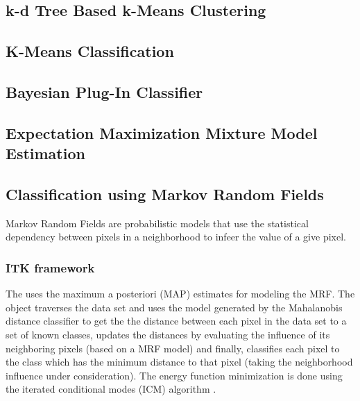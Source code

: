 \subsection{k-d Tree Based k-Means Clustering}
\label{sec:KdTreeBasedKMeansClustering}
\ifitkFullVersion

\fi

\subsection{K-Means Classification}
\label{sec:KMeansClassifier}
\ifitkFullVersion

\fi
\ifitkFullVersion

\fi

\subsection{Bayesian Plug-In Classifier}
\label{sec:BayesianPluginClassifier}

\ifitkFullVersion 

\fi


\subsection{Expectation Maximization Mixture Model Estimation}
\label{sec:ExpectationMaximizationMixtureModelEstimation}

\ifitkFullVersion 

\fi

\subsection{Classification using Markov Random Fields}
\label{sec:MarkovRandomField}

Markov Random Fields are probabilistic models that use the statistical
dependency between
pixels in a neighborhood to infeer the value of a give pixel.

\subsubsection{ITK framework}
\label{sec:MarkovRandomFieldITK}
The
 uses the maximum a posteriori (MAP)
estimates for modeling the MRF. The object traverses the data set and uses the
model generated by the Mahalanobis distance classifier to get the the distance
between each pixel in the data set to a set of known classes, updates the
distances by evaluating the influence of its neighboring pixels (based on a MRF
model) and finally, classifies each pixel to the class which has the minimum
distance to that pixel (taking the neighborhood influence under consideration).
The energy function minimization is done using the iterated conditional modes
(ICM) algorithm \cite{Besag1986}.

